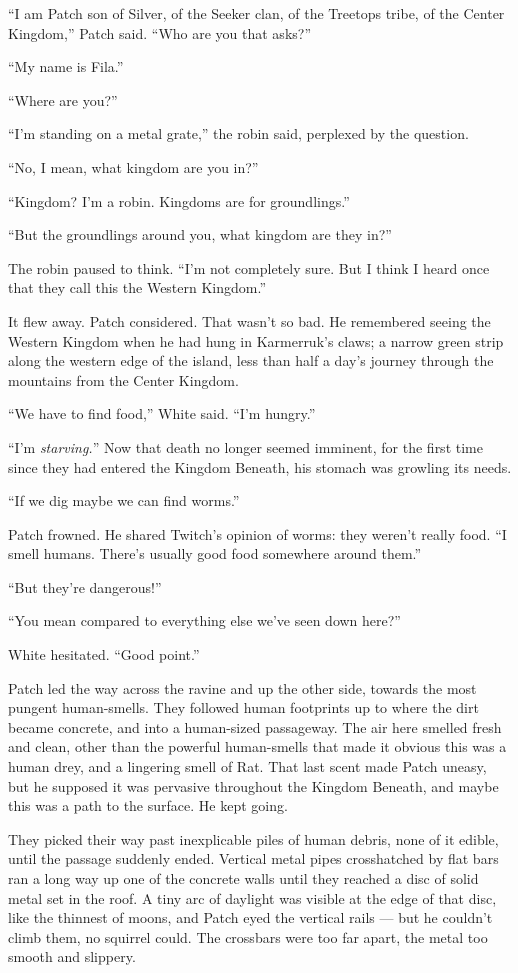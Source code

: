 \documentclass[ebook,oneside,openany,17pt]{memoir}
\begin{document}
“I am Patch son of Silver, of the Seeker clan, of the Treetops tribe,
of the Center Kingdom,” Patch said. “Who are you that asks?”

“My name is Fila.”

“Where are you?”

“I’m standing on a metal grate,” the robin said, perplexed by the
question.

“No, I mean, what kingdom are you in?”

“Kingdom? I’m a robin. Kingdoms are for groundlings.”

“But the groundlings around you, what kingdom are they in?”

The robin paused to think. “I’m not completely sure. But I think I
heard once that they call this the Western Kingdom.”

It flew away. Patch considered. That wasn’t so bad. He remembered
seeing the Western Kingdom when he had hung in Karmerruk’s claws; a
narrow green strip along the western edge of the island, less than
half a day’s journey through the mountains from the Center Kingdom.

“We have to find food,” White said. “I’m hungry.”

“I’m \emph{starving.}” Now that death no longer seemed imminent, for
the first time since they had entered the Kingdom Beneath, his stomach
was growling its needs.

“If we dig maybe we can find worms.”

Patch frowned. He shared Twitch’s opinion of worms: they weren’t
really food. “I smell humans. There’s usually good food somewhere
around them.”

“But they’re dangerous!”

“You mean compared to everything else we’ve seen down here?”

White hesitated. “Good point.”

Patch led the way across the ravine and up the other side, towards the
most pungent human-smells. They followed human footprints up to where
the dirt became concrete, and into a human-sized passageway. The air
here smelled fresh and clean, other than the powerful human-smells
that made it obvious this was a human drey, and a lingering smell of
Rat. That last scent made Patch uneasy, but he supposed it was
pervasive throughout the Kingdom Beneath, and maybe this was a path to
the surface. He kept going.

They picked their way past inexplicable piles of human debris, none of
it edible, until the passage suddenly ended. Vertical metal pipes
crosshatched by flat bars ran a long way up one of the concrete walls
until they reached a disc of solid metal set in the roof. A tiny arc
of daylight was visible at the edge of that disc, like the thinnest of
moons, and Patch eyed the vertical rails — but he couldn’t climb them,
no squirrel could. The crossbars were too far apart, the metal too
smooth and slippery.
\end{document}
